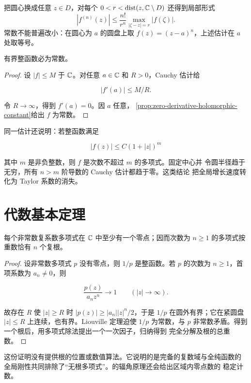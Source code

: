 把圆心换成任意 \(z\in D\)，对每个
\(0<r<\operatorname{dist}(z,\mathbb{C}\setminus D)\) 还得到局部形式
\[
 |f^{(n)}(z)|
 \le \frac{n!}{r^n}\max_{|\zeta-z|=r}|f(\zeta)|.
\]
常数不能普遍改小：在圆心为 \(a\) 的圆盘上取
\(f(z)=(z-a)^n\)，上述估计在 \(a\) 处取等号。

\begin{theorem}[Liouville 定理]
\label{thm:liouville}
有界整函数必为常数。
\end{theorem}

\begin{proof}
设 \(|f|\le M\) 于 \(\mathbb{C}\)。对任意 \(a\in\mathbb{C}\) 和 \(R>0\)，Cauchy 估计给

\[
 |f'(a)|\le M/R.
\]

令 \(R\to\infty\)，得到 \(f'(a)=0\)。因 \(a\) 任意，
\ref{prop:zero-derivative-holomorphic-constant}给出 \(f\) 为常数。
\end{proof}

同一估计还说明：若整函数满足

\[
 |f(z)|\le C(1+|z|)^m
\]

其中 \(m\) 是非负整数，则 \(f\) 是次数不超过 \(m\) 的多项式。固定中心并
令圆半径趋于无穷，所有 \(n>m\) 阶导数的 Cauchy 估计都趋于零。这类结论
把全局增长速度转化为 Taylor 系数的消失。

\section{代数基本定理}

\begin{theorem}[代数基本定理]
\label{thm:fundamental-theorem-algebra-complex}
每个非常数复系数多项式在 \(\mathbb{C}\) 中至少有一个零点；因而次数为 \(n\ge1\)
的多项式按重数恰有 \(n\) 个复根。
\end{theorem}

\begin{proof}
设非常数多项式 \(p\) 没有零点，则 \(1/p\) 是整函数。若 \(p\) 的次数为
\(n\ge1\)，首项系数为 \(a_n\ne0\)，则

\[
 \frac{p(z)}{a_nz^n}\longrightarrow1\qquad(|z|\to\infty).
\]

故存在 \(R\) 使 \(|z|\ge R\) 时
\(|p(z)|\ge |a_n||z|^n/2\)，于是 \(1/p\) 在圆外有界；它在紧圆盘
\(|z|\le R\) 上连续，也有界。Liouville 定理迫使 \(1/p\) 为常数，与
\(p\) 非常数矛盾。得到一个根后，用多项式除法提出一个一次因子，归纳得到
完全分解及根的总重数。
\end{proof}

这份证明没有提供根的位置或数值算法。它说明的是完备的复数域与全纯函数的
全局刚性共同排除了“无根多项式”。的辐角原理还会给出区域内零点数的
稳定计数。

